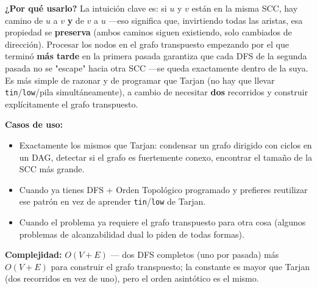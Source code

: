 \documentclass[10pt,a4paper,twocolumn]{article}
\begin{document}
\textbf{¿Por qué usarlo?} La intuición clave es: si $u$ y $v$ están
en la misma SCC, hay camino de $u$ a $v$ \textbf{y} de $v$ a $u$ —eso
significa que, invirtiendo todas las aristas, esa propiedad se
\textbf{preserva} (ambos caminos siguen existiendo, solo cambiados de
dirección). Procesar los nodos en el grafo transpuesto empezando por
el que terminó \textbf{más tarde} en la primera pasada garantiza que
cada DFS de la segunda pasada no se "escape" hacia otra SCC —se queda
exactamente dentro de la suya. Es más simple de razonar y de
programar que Tarjan (no hay que llevar \texttt{tin}/\texttt{low}/pila
simultáneamente), a cambio de necesitar \textbf{dos} recorridos y
construir explícitamente el grafo transpuesto.

\textbf{Casos de uso:}

\begin{itemize}
	\item Exactamente los mismos que Tarjan: condensar un grafo
	dirigido con ciclos en un DAG, detectar si el grafo es fuertemente
	conexo, encontrar el tamaño de la SCC más grande.
	\item Cuando ya tienes DFS + Orden Topológico programado y
	prefieres reutilizar ese patrón en vez de aprender
	\texttt{tin}/\texttt{low} de Tarjan.
	\item Cuando el problema ya requiere el grafo transpuesto para
	otra cosa (algunos problemas de alcanzabilidad dual lo piden de
	todas formas).
\end{itemize}

\textbf{Complejidad:} $O(V + E)$ — dos DFS completos (uno por
pasada) más $O(V+E)$ para construir el grafo transpuesto; la
constante es mayor que Tarjan (dos recorridos en vez de uno), pero el
orden asintótico es el mismo.
\end{document}
